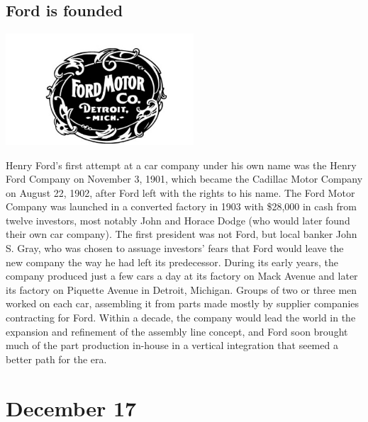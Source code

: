 \documentclass[11pt]{report}
\begin{document}
\subsection{Ford is founded}
\vspace{2mm}\begin{center}\includegraphics[width=7cm]{./img/fordfirstlogo.png}\end{center}
Henry Ford's first attempt at a car company under his own name was the Henry Ford Company on November 3, 1901, which became the Cadillac Motor Company on August 22, 1902, after Ford left with the rights to his name. The Ford Motor Company was launched in a converted factory in 1903 with \$28,000 in cash from twelve investors, most notably John and Horace Dodge (who would later found their own car company). The first president was not Ford, but local banker John S. Gray, who was chosen to assuage investors' fears that Ford would leave the new company the way he had left its predecessor. During its early years, the company produced just a few cars a day at its factory on Mack Avenue and later its factory on Piquette Avenue in Detroit, Michigan. Groups of two or three men worked on each car, assembling it from parts made mostly by supplier companies contracting for Ford. Within a decade, the company would lead the world in the expansion and refinement of the assembly line concept, and Ford soon brought much of the part production in-house in a vertical integration that seemed a better path for the era.


\section{December 17}
\end{document}
